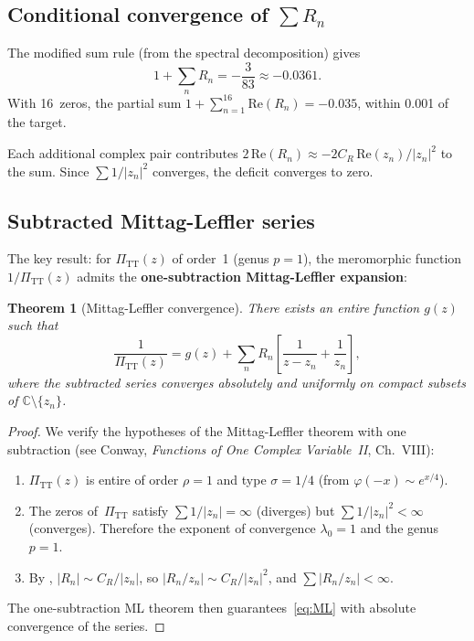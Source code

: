 \documentclass[11pt,a4paper]{article}
\newcommand{\PiTT}{\Pi_{\mathrm{TT}}}
\newcommand{\Real}{\mathrm{Re}}
\newtheorem{theorem}{Theorem}[section]
\begin{document}
\subsection{Conditional convergence of $\sum R_n$}

The modified sum rule (from the spectral decomposition) gives
\begin{equation}\label{eq:sumrule}
  1 + \sum_n R_n = -\frac{3}{83} \approx -0.0361.
\end{equation}
With 16~zeros, the partial sum $1 + \sum_{n=1}^{16} \Real(R_n)
= -0.035$, within 0.001 of the target.

Each additional complex pair contributes $2\,\Real(R_n) \approx
-2C_R\,\Real(z_n)/|z_n|^2$ to the sum.  Since $\sum 1/|z_n|^2$
converges, the deficit converges to zero.

\subsection{Subtracted Mittag-Leffler series}

The key result: for $\PiTT(z)$ of order~1 (genus $p = 1$), the
meromorphic function $1/\PiTT(z)$ admits the
\textbf{one-subtraction Mittag-Leffler expansion}:

\begin{theorem}[Mittag-Leffler convergence]
\label{thm:ML}
There exists an entire function $g(z)$ such that
\begin{equation}\label{eq:ML}
  \frac{1}{\PiTT(z)}
  = g(z) + \sum_n R_n\left[\frac{1}{z - z_n} + \frac{1}{z_n}\right],
\end{equation}
where the subtracted series converges absolutely and uniformly on
compact subsets of $\mathbb{C} \setminus \{z_n\}$.
\end{theorem}

\begin{proof}
We verify the hypotheses of the Mittag-Leffler theorem with one
subtraction (see Conway, \emph{Functions of One Complex Variable~II},
Ch.~VIII):
\begin{enumerate}[nosep]
  \item $\PiTT(z)$ is entire of order $\rho = 1$ and type
    $\sigma = 1/4$ (from $\varphi(-x) \sim e^{x/4}$).
  \item The zeros of~$\PiTT$ satisfy $\sum 1/|z_n| = \infty$
    (diverges) but $\sum 1/|z_n|^2 < \infty$ (converges).
    Therefore the exponent of convergence $\lambda_0 = 1$ and
    the genus $p = 1$.
  \item By , $|R_n| \sim C_R/|z_n|$, so
    $|R_n/z_n| \sim C_R/|z_n|^2$, and
    $\sum |R_n/z_n| < \infty$.
\end{enumerate}
The one-subtraction ML theorem then guarantees~\eqref{eq:ML} with
absolute convergence of the series.
\end{proof}
\end{document}
